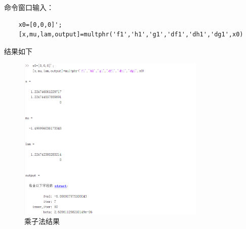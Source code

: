 \documentclass[12pt]{article} %
\begin{document}
	\indent 命令窗口输入：
	\begin{lstlisting}
	x0=[0,0,0]';
	[x,mu,lam,output]=multphr('f1','h1','g1','df1','dh1','dg1',x0)
	\end{lstlisting}
	\indent 结果如下
	\begin{figure}[ht]
		\centering
		\includegraphics[width=0.8\textwidth]{phr.png}
		\caption{乘子法结果}
		\label{fig:fig1}
	\end{figure}
\end{document}

